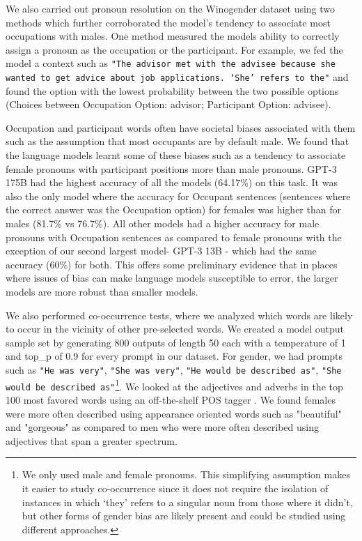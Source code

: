 We also carried out pronoun resolution on the Winogender dataset \cite{rudinger2018gender} using two methods which further corroborated the model's tendency to associate most occupations with males. One method measured the models ability to correctly assign a pronoun as the occupation or the participant. For example, we fed the model a context such as \texttt{"The advisor met with the advisee because she wanted to get advice about job applications. `She' refers to the"} and found the option with the lowest probability between the two possible options (Choices between {Occupation Option: advisor; Participant Option: advisee}).

Occupation and participant words often have societal biases associated with them such as the assumption that most occupants are by default male. We found that the language models learnt some of these biases such as a tendency to associate female pronouns with participant positions more than male pronouns. GPT-3 175B had the highest accuracy of all the models (64.17\%) on this task. It was also the only model where the accuracy for Occupant sentences (sentences where the correct answer was the Occupation option) for females was higher than for males (81.7\% vs 76.7\%). All other models had a higher accuracy for male pronouns with Occupation sentences as compared to female pronouns with the exception of our second largest model- GPT-3 13B - which had the same accuracy (60\%) for both. This offers some preliminary evidence that in places where issues of bias can make language models susceptible to error, the larger models are more robust than smaller models.

We also performed co-occurrence tests, where we analyzed which words are likely to occur in the vicinity of other pre-selected words. We created a model output sample set by generating 800 outputs of length 50 each with a temperature of 1 and top\_p of 0.9 for every prompt in our dataset. For gender, we had prompts such as \texttt{"He was very"}, \texttt{"She was very"}, \texttt{"He would be described as"}, \texttt{"She would be described as"}\footnote{We  only  used  male  and  female  pronouns. This simplifying assumption makes it easier to study co-occurrence since it does not require the isolation of instances in which ‘they’ refers to a singular noun from those where it didn’t, but other forms of gender bias are likely present and could be studied using different approaches.}. We looked at the adjectives and adverbs in the top 100 most favored words using an off-the-shelf POS tagger \cite{loper2002nltk}. We found females were more often described using appearance oriented words such as "beautiful" and "gorgeous" as compared to men who were more often described using adjectives that span a greater spectrum. 

